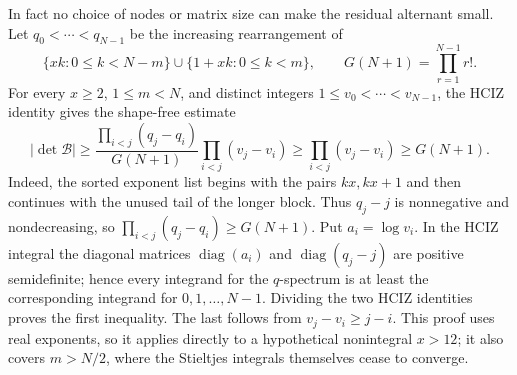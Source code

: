 \documentclass[11pt,oneside]{article}
\theoremstyle{definition}
\theoremstyle{remark}
\begin{document}
In fact no choice of nodes or matrix size can make the residual alternant small.  Let
$q_0<\cdots<q_{N-1}$ be the increasing rearrangement of
\[
 \{xk:0\le k<N-m\}\cup\{1+xk:0\le k<m\},
 \qquad G(N+1)=\prod_{r=1}^{N-1}r!.
\]
For every $x\ge2$, $1\le m<N$, and distinct integers
$1\le v_0<\cdots<v_{N-1}$, the HCIZ identity gives the shape-free estimate
\begin{equation}
 \boxed{
 |\det\mathcal B|
 \ge \frac{\prod_{i<j}(q_j-q_i)}{G(N+1)}
       \prod_{i<j}(v_j-v_i)
 \ge \prod_{i<j}(v_j-v_i)
 \ge G(N+1).}
 \label{crit:eq-reciprocal-shape-free}
\end{equation}
Indeed, the sorted exponent list begins with the pairs $kx,kx+1$ and then continues with
the unused tail of the longer block.  Thus $q_j-j$ is nonnegative and nondecreasing, so
$\prod_{i<j}(q_j-q_i)\ge G(N+1)$.  Put $a_i=\log v_i$.  In the HCIZ integral the diagonal
matrices $\operatorname{diag}(a_i)$ and
$\operatorname{diag}(q_j-j)$ are positive semidefinite; hence every integrand for the
$q$-spectrum is at least the corresponding integrand for $0,1,\ldots,N-1$.  Dividing the
two HCIZ identities proves the first inequality.  The last follows from
$v_j-v_i\ge j-i$.  This proof uses real exponents, so it applies directly to a hypothetical
nonintegral $x>12$; it also covers $m>N/2$, where the Stieltjes integrals themselves cease
to converge.
\end{document}
